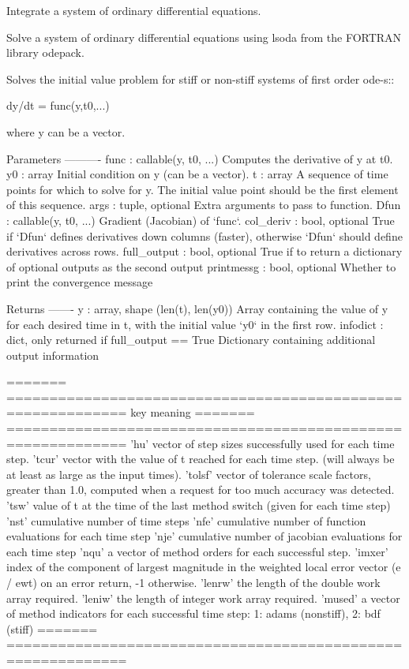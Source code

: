 \begin{DoxyVerb}Integrate a system of ordinary differential equations.

Solve a system of ordinary differential equations using lsoda from the
FORTRAN library odepack.

Solves the initial value problem for stiff or non-stiff systems
of first order ode-s::

    dy/dt = func(y,t0,...)

where y can be a vector.

Parameters
----------
func : callable(y, t0, ...)
    Computes the derivative of y at t0.
y0 : array
    Initial condition on y (can be a vector).
t : array
    A sequence of time points for which to solve for y.  The initial
    value point should be the first element of this sequence.
args : tuple, optional
    Extra arguments to pass to function.
Dfun : callable(y, t0, ...)
    Gradient (Jacobian) of `func`.
col_deriv : bool, optional
    True if `Dfun` defines derivatives down columns (faster),
    otherwise `Dfun` should define derivatives across rows.
full_output : bool, optional
    True if to return a dictionary of optional outputs as the second output
printmessg : bool, optional
    Whether to print the convergence message

Returns
-------
y : array, shape (len(t), len(y0))
    Array containing the value of y for each desired time in t,
    with the initial value `y0` in the first row.
infodict : dict, only returned if full_output == True
    Dictionary containing additional output information

    =======  ============================================================
    key      meaning
    =======  ============================================================
    'hu'     vector of step sizes successfully used for each time step.
    'tcur'   vector with the value of t reached for each time step.
             (will always be at least as large as the input times).
    'tolsf'  vector of tolerance scale factors, greater than 1.0,
             computed when a request for too much accuracy was detected.
    'tsw'    value of t at the time of the last method switch
             (given for each time step)
    'nst'    cumulative number of time steps
    'nfe'    cumulative number of function evaluations for each time step
    'nje'    cumulative number of jacobian evaluations for each time step
    'nqu'    a vector of method orders for each successful step.
    'imxer'  index of the component of largest magnitude in the
             weighted local error vector (e / ewt) on an error return, -1
             otherwise.
    'lenrw'  the length of the double work array required.
    'leniw'  the length of integer work array required.
    'mused'  a vector of method indicators for each successful time step:
             1: adams (nonstiff), 2: bdf (stiff)
    =======  ============================================================


\end{DoxyVerb}
